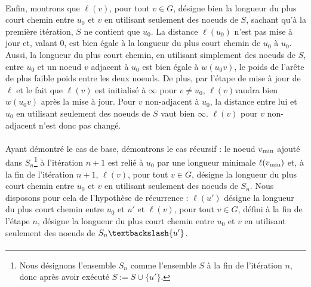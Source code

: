 \paragraph{}

Enfin, montrons que $\ell(v)$, pour tout $v \in G$, désigne bien la longueur du plus court chemin entre $u_0$ et $v$ en utilisant seulement des noeuds de $S$, sachant qu'à la première itération, $S$ ne contient que $u_0$. La distance $\ell(u_0)$ n'est pas mise à jour et, valant 0, est bien égale à la longueur du plus court chemin de $u_0$ à $u_0$. Aussi, la longueur du plus court chemin, en utilisant simplement des noeuds de $S$, entre $u_0$ et un noeud $v$ adjacent à $u_0$ est bien égale à $w(u_0 v)$, le poids de l'arête de plus faible poids entre les deux noeuds. De plus, par l'étape de mise à jour de $\ell$ et le fait que $\ell(v)$ est initialisé à $\infty$ pour $v \neq u_0$, $\ell(v)$vaudra bien $w(u_0 v)$ après la mise à jour. Pour $v$ non-adjacent à $u_0$, la distance entre lui et $u_0$ en utilisant seulement des noeuds de $S$ vaut bien $\infty$. $\ell(v)$ pour $v$ non-adjacent n'est donc pas changé. 

\paragraph{}

Ayant démontré le cas de base, démontrons le cas récursif : le noeud $v_\mathrm{min}$ ajouté dans $S_n$\footnote{Nous désignons l'ensemble $S_n$ comme l'ensemble $S$ à la fin de l'itération $n$, donc après avoir exécuté $S:=S \cup \{u'\}$.} à l'itération $n+1$ est relié à $u_0$ par une longueur minimale $\ell(v_\mathrm{min})$ et, à la fin de l'itération $n+1$, $\ell(v)$, pour tout $v \in G$, désigne la longueur du plus court chemin entre $u_0$ et $v$ en utilisant seulement des noeuds de $S_n$. Nous disposons pour cela de l'hypothèse de récurrence : $\ell(u')$ désigne la longueur du plus court chemin entre $u_0$ et $u'$ et $\ell(v)$, pour tout $v \in G$, défini à la fin de l'étape $n$,  désigne la longueur du plus court chemin entre $u_0$ et $v$ en utilisant seulement des noeuds de $S_n \textbackslash \{u'\}$.  

\paragraph{}

